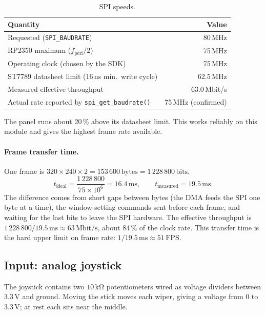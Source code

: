 \documentclass[11pt,a4paper]{article}
\newcommand{\unit}[2]{\ensuremath{#1\,\mathrm{#2}}}
\begin{document}
\begin{table}[H]
\centering
\caption{SPI speeds.}\label{tab:spi}
\begin{tabular}{lr}
\toprule
\textbf{Quantity} & \textbf{Value} \\
\midrule
Requested (\texttt{SPI\_BAUDRATE}) & 80\,MHz \\
RP2350 maximum ($f_{\text{peri}}/2$) & 75\,MHz \\
Operating clock (chosen by the SDK) & 75\,MHz \\
ST7789 datasheet limit (16\,ns min.\ write cycle) & 62.5\,MHz \\
Measured effective throughput & 63.0\,Mbit/s \\
Actual rate reported by \texttt{spi\_get\_baudrate()} & 75\,MHz (confirmed) \\
\bottomrule
\end{tabular}
\end{table}

\noindent The panel runs about 20\,\% above its datasheet limit. This works
reliably on this module and gives the highest frame rate available.

\paragraph{Frame transfer time.} One frame is
$320 \times 240 \times 2 = \unit{153\,600}{bytes} = \unit{1\,228\,800}{bits}$.
\[
  t_{\text{ideal}} = \frac{1\,228\,800}{75\times10^{6}} = \unit{16.4}{ms},
  \qquad t_{\text{measured}} = \unit{19.5}{ms}.
\]
The difference comes from short gaps between bytes (the DMA feeds the SPI one
byte at a time), the window-setting commands sent before each frame, and
waiting for the last bits to leave the SPI hardware. The effective throughput is
$1\,228\,800/\unit{19.5}{ms} \approx \unit{63}{Mbit/s}$, about 84\,\% of the
clock rate. This transfer time is the hard upper limit on frame rate:
$1/\unit{19.5}{ms} \approx \unit{51}{FPS}$.

\subsection{Input: analog joystick}\label{sec:joystick}
The joystick contains two \unit{10}{k\Omega} potentiometers wired as voltage
dividers between 3.3\,V and ground. Moving the stick moves each wiper, giving a
voltage from 0 to 3.3\,V; at rest each sits near the middle.
\end{document}
